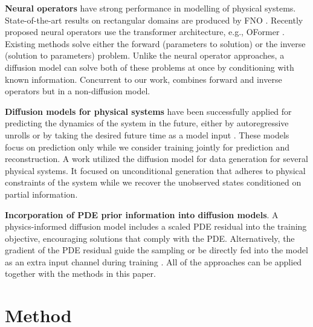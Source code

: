 \documentclass{article}
\begin{document}
{\bf Neural operators} \cite{kovachki2023neural} have strong performance in modelling of physical systems. State-of-the-art results on rectangular domains are produced by FNO \cite{li2021fourier}. Recently proposed neural operators use the transformer architecture, e.g., OFormer \cite{li2023transformer}. 
Existing methods solve either the forward (parameters to solution) or the inverse (solution to parameters) problem. Unlike the neural operator approaches, a diffusion model can solve both of these problems at once by conditioning with known information. Concurrent to our work, \cite{long2024invertible} combines forward and inverse operators but in a non-diffusion model. 

{\bf Diffusion models for physical systems} have been successfully applied for predicting the dynamics of the system in the future, either by autoregressive unrolls \cite{kohl2023turbulent} or by taking the desired future time as a model input \cite{yang2023denoising}.
These models focus on prediction only while we consider training jointly for prediction and reconstruction. A work \cite{apte2023diffusion} utilized the diffusion model for data generation for several physical systems. It focused on unconditional generation that adheres to physical constraints of the system while we recover the unobserved states conditioned on partial information.

{\bf Incorporation of PDE prior information into diffusion models}.
A physics-informed diffusion model \cite{bastek2024physics} includes  a scaled PDE residual into the training objective, encouraging solutions that comply with the PDE. Alternatively, the gradient of the PDE residual guide the sampling \cite{jacobsen2023cocogen} or be directly fed into the model as an extra input channel during training \cite{shu2023physics}. 
All of the approaches can be applied together with the methods in this paper.




\section{Method}
\end{document}

